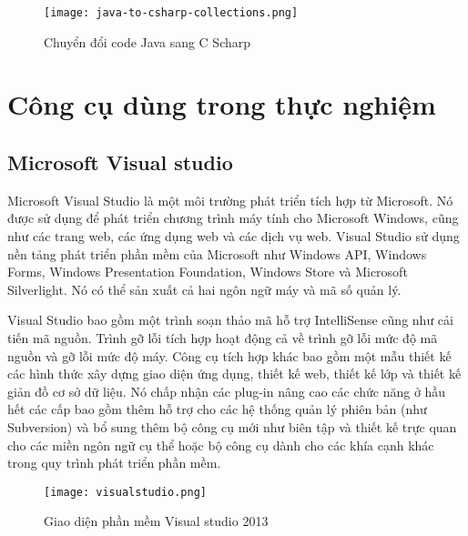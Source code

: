 \begin{center}
	\begin{figure}[htp]
		\begin{center}
			\texttt{[image: java-to-csharp-collections.png]}
		\end{center}
		\caption{Chuyển đổi code Java sang C Scharp}
		\label{refhinh1}
	\end{figure}
\end{center}

\section{Công cụ dùng trong thực nghiệm}
\subsection*{Microsoft Visual studio}
Microsoft Visual Studio là một môi trường phát triển tích hợp từ Microsoft. Nó được sử dụng để phát triển chương trình máy tính cho Microsoft Windows, cũng như các trang web, các ứng dụng web và các dịch vụ web. Visual Studio sử dụng nền tảng phát triển phần mềm của Microsoft như Windows API, Windows Forms, Windows Presentation Foundation, Windows Store và Microsoft Silverlight. Nó có thể sản xuất cả hai ngôn ngữ máy và mã số quản lý.

Visual Studio bao gồm một trình soạn thảo mã hỗ trợ IntelliSense cũng như cải tiến mã nguồn. Trình gỡ lỗi tích hợp hoạt động cả về trình gỡ lỗi mức độ mã nguồn và gỡ lỗi mức độ máy. Công cụ tích hợp khác bao gồm một mẫu thiết kế các hình thức xây dựng giao diện ứng dụng, thiết kế web, thiết kế lớp và thiết kế giản đồ cơ sở dữ liệu. Nó chấp nhận các plug-in nâng cao các chức năng ở hầu hết các cấp bao gồm thêm hỗ trợ cho các hệ thống quản lý phiên bản (như Subversion) và bổ sung thêm bộ công cụ mới như biên tập và thiết kế trực quan cho các miền ngôn ngữ cụ thể hoặc bộ công cụ dành cho các khía cạnh khác trong quy trình phát triển phần mềm.

\begin{center}
	\begin{figure}[htp]
		\begin{center}
			\texttt{[image: visualstudio.png]}
		\end{center}
		\caption{Giao diện phần mềm Visual studio 2013}
		\label{refhinh1}
	\end{figure}
\end{center}

